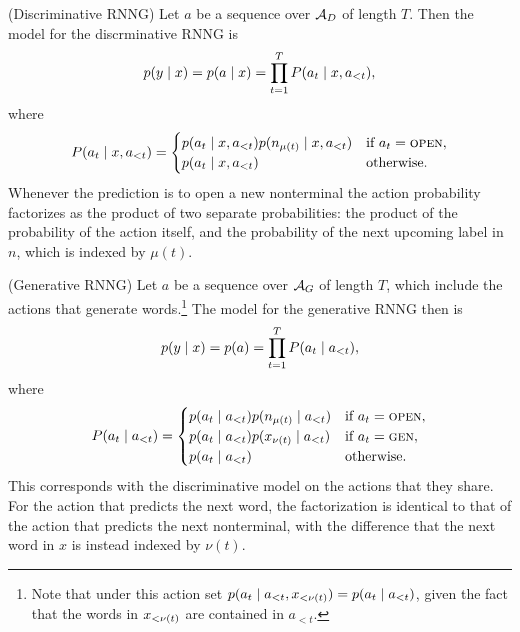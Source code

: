     \begin{definition}{(Discriminative RNNG)}
      Let $a$ be a sequence over $\mathcal{A}_D$ of length $T$. Then the model for the discrminative RNNG is
      \begin{align*}
        \label{eq:disc-model}
        p(y \mid x) = p(a \mid x) = \prod_{t=1}^T P( a_t \mid x, a_{<t}),
      \end{align*}
      where
      \begin{equation*}
        P( a_t \mid x, a_{<t}) =
        \begin{cases}
          p( a_t \mid x, a_{<t} ) p( n_{ \mu(t) } \mid x, a_{<t} ) & \text{if } a_t = \textsc{open},  \\
          p( a_t \mid x, a_{<t} ) & \text{otherwise.}  \\
        \end{cases}
      \end{equation*}
    Whenever the prediction is to open a new nonterminal the action probability factorizes as the product of two separate probabilities: the product of the probability of the action itself, and the probability of the next upcoming label in $n$, which is indexed by $\mu(t)$.
    \end{definition}

    \begin{definition}{(Generative RNNG)}
      Let $a$ be a sequence over $\mathcal{A}_G$ of length $T$, which include the actions that generate words.\footnote{Note that under this action set $p(a_t \mid a_{<t}, x_{<\nu(t)}) = p(a_t \mid a_{<t})$, given the fact that the words in $x_{<\nu(t)}$ are contained in $a_{<t}$.} The model for the generative RNNG then is
      \begin{align*}
        \label{eq:gen-model}
        p(y \mid x) = p(a) = \prod_{t=1}^T P( a_t \mid a_{<t}),
      \end{align*}
      where
      \begin{equation*}
        P( a_t \mid a_{<t} ) =
        \begin{cases}
          p( a_t \mid a_{<t} ) p(n_{ \mu(t) } \mid a_{<t} ) & \text{if } a_t = \textsc{open},  \\
          p( a_t \mid a_{<t} ) p(x_{ \nu(t) } \mid a_{<t} ) & \text{if } a_t = \textsc{gen},  \\
          p( a_t \mid a_{<t} ) & \text{otherwise.}  \\
        \end{cases}
      \end{equation*}
      This corresponds with the discriminative model on the actions that they share. For the action that predicts the next word, the factorization is identical to that of the action that predicts the next nonterminal, with the difference that the next word in $x$ is instead indexed by $\nu(t)$.
    \end{definition}

